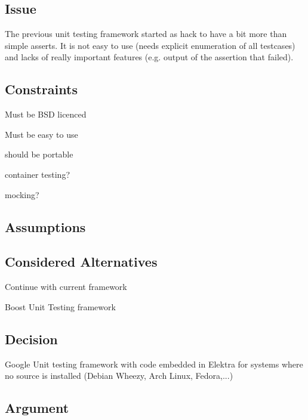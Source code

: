 \subsection*{Issue}

The previous unit testing framework started as hack to have a bit more than simple asserts. It is not easy to use (needs explicit enumeration of all testcases) and lacks of really important features (e.\+g. output of the assertion that failed).

\subsection*{Constraints}


\begin{DoxyItemize}
\item Must be B\+S\+D licenced
\item Must be easy to use
\item should be portable
\item container testing?
\item mocking?
\end{DoxyItemize}

\subsection*{Assumptions}

\subsection*{Considered Alternatives}


\begin{DoxyItemize}
\item Continue with current framework
\item Boost Unit Testing framework
\end{DoxyItemize}

\subsection*{Decision}


\begin{DoxyItemize}
\item Google Unit testing framework with code embedded in Elektra for systems where no source is installed (Debian Wheezy, Arch Linux, Fedora,...)
\end{DoxyItemize}

\subsection*{Argument}


